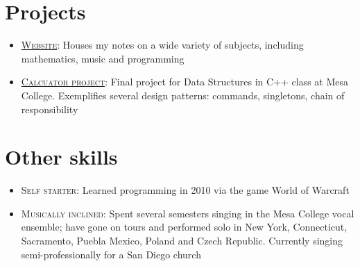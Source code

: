 \documentclass[10pt, letterpaper]{article}
\begin{document}
\section{Projects}
\begin{footnotesize}
  \begin{itemize}
    \item
      \textsc{\href{https://nilsso.github.io}{Website}:}
      Houses my notes on a wide variety of subjects, including mathematics, music and programming

    \item
      \textsc{\href{https://github.com/nilsso/ACalculator}{Calcuator project}:}
      Final project for Data Structures in C++ class at Mesa
      College. Exemplifies several design patterns: commands, singletons, chain
      of responsibility
  \end{itemize}
\end{footnotesize}

\section{Other skills}
\begin{footnotesize}
  \begin{itemize}
    \item
      \textsc{Self starter:}
      Learned programming in 2010 via the game World of Warcraft

    \item
      \textsc{Musically inclined:}
      Spent several semesters singing in the Mesa College vocal ensemble; have
      gone on tours and performed solo in New York, Connecticut, Sacramento,
      Puebla Mexico, Poland and Czech Republic. Currently singing
      semi-professionally for a San Diego church
  \end{itemize}
\end{footnotesize}
\end{document}
